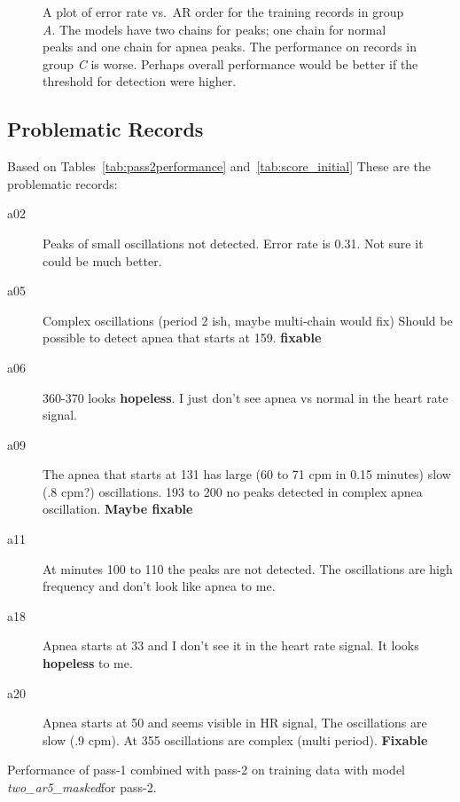 \documentclass[12pt]{article}
\newcommand{\BestModel}{\emph{two\_ar5\_masked}}
\begin{document}
\begin{figure}
  \centering
    \caption{A plot of error rate vs.\ AR order for the training
      records in group \emph{A}.  The models have two chains for
      peaks; one chain for normal peaks and one chain for apnea
      peaks.  The performance on records in group \emph{C} is worse.
      Perhaps overall performance would be better if the threshold for
      detection were higher.}
  \label{fig:errors_vs_ar_order}
\end{figure}

\subsection{Problematic Records}
\label{sec:problematic_records}

Based on Tables~\ref{tab:pass2performance} and~\ref{tab:score_initial}
These are the problematic records:
\begin{description}
\item[a02] Peaks of small oscillations not detected.  Error rate is
  0.31.  Not sure it could be much better.
\item[a05] Complex oscillations (period 2 ish, maybe multi-chain would
  fix) Should be possible to detect apnea that starts at 159.
  \textbf{fixable}
\item[a06] 360-370 looks \textbf{hopeless}.  I just don't see apnea vs
  normal in the heart rate signal.
\item[a09] The apnea that starts at 131 has large (60 to 71 cpm in
  0.15 minutes) slow (.8 cpm?) oscillations.  193 to 200 no peaks
  detected in complex apnea oscillation.  \textbf{Maybe fixable}
\item[a11] At minutes 100 to 110 the peaks are not detected.  The
  oscillations are high frequency and don't look like apnea to me.
\item[a18] Apnea starts at 33 and I don't see it in the heart rate
  signal.  It looks \textbf{hopeless} to me.
\item[a20] Apnea starts at 50 and seems visible in HR signal,  The
  oscillations are slow (.9 cpm).  At 355 oscillations are complex
  (multi period).  \textbf{Fixable}
\end{description}

\begin{table*}
  \centering
  
  \caption[Performance]{Performance of pass-1 combined with pass-2 on
    training data with model
    \BestModel for pass-2.}
  \label{tab:score_initial}
\end{table*}
\end{document}
